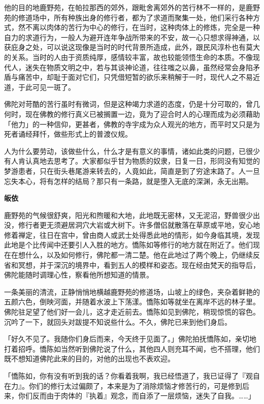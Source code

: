 \documentclass[twoside,openany]{book}
\newcommand{\mt}[1]{\textbullet \textbf{#1}}
\begin{document}
他的目的地鹿野苑，在帕拉那西的郊外，跟毗舍离郊外的苦行林不一样的，是鹿野苑的修道场中，所有种族出身的修行者，都为了求道而聚集一处，他们采行各种方式，然不离以肉体的苦行为中心的修行，在当时，这种肉体上的修炼，完全是一种自力的求道行为，一般人为避开连年争战所带来的不安，故一心只想求得神通，以获庇身之处，可以说这现像是当时的时代背景所造成，此外，跟民风淳朴也有莫大的关系。当时的人由于资质纯厚，感情较丰富，故也较能领悟生命的本质。不像现代人，迷失在物质文明之中，若与其谈神论道，往往嗤之以鼻，虽然经常会身陷矛盾与痛苦中，却耻于面对它们，只凭借短暂的欲乐来稍解于一时，现代人之不易近道，于此可见一斑了。

佛陀对苛酷的苦行虽时有微词，但是这种竭力求道的态度，仍是十分可取的，曾几何时，现在佛教的修行真义已被搁置一边，竟为了迎合时人的心理而成为必须藉助「他力」的一种信仰，更甚者，佛教的寺宇成为众人观光的地方，而平时又只是为死者诵经拜忏，做些形式上的普渡仪规。

人为什么要劳动，该做些什么，什么才是有意义的事情，诸如此类的问题，已很少有人肯认真地去思考了。大家都似乎甘为物质的奴隶，日复一日，形同没有知觉的梦游患者，只在街头巷尾游来转去的，人竟如此，简直是到了穷途末路了。人一旦忘失本心，将有怎样的结局？那只有一条路，就是堕入无底的深渊，永无出期。

\mt{皈依}

鹿野苑的气候很舒爽，阳光和煦暖和大地，此地既无密林，又无泥沼，野兽很少出没，修行者更无须避居洞穴大岩或大树下。许多僧侣就散落在草原或平地，安心地修着禅定，往日在宫中，曾由商人或武士处得悉此地的情形，如今身临其境，发现此地是个比传闻中还要引人入胜的地方。憍陈如等修行的地方就在附近了。他们现在在想什么，以及如何修行，佛陀都一清二楚。他在此地过了两个晚上，仍继续反省和冥想，并于深沉的境界中，看到五人的模样和姿态。现在经由梵天的指导后，佛陀能随时调理心性，察看他所想知道的情景。

一条美丽的清流，正静悄悄地横越鹿野苑的修道场，山坡上的绿色，夹杂着鲜艳的五颜六色，倒映河面，并随着水波上下荡漾。憍陈如等就坐在离岸不远的林子里。佛陀驻足望了他们好一会儿，这才走近前去。憍陈如见到佛陀，稍现惊慌的容色。沉吟了一下，就回头对跋提不知说些什么。不久，佛陀已来到他们身后。

「好久不见了。我随你们身后而来，今天终于见面了。」佛陀拍抚憍陈如，亲切地打着招呼。憍陈如当然听到佛陀说了什么，其他四人则充耳不闻，也不搭理，他们既不想知道佛陀此来的目的，对他的出现也不表欢迎。

「憍陈如，你有没有听到我的话？你看着我啊，我已经悟道了，我已证得了『观自在力』。你们的修行太过偏颇了，本来是为了消除烦恼才修苦行的，可是修到后来，你们反而由于肉体的『执着』观念，而自添了一层烦恼，迷失了自我。……」
\end{document}
